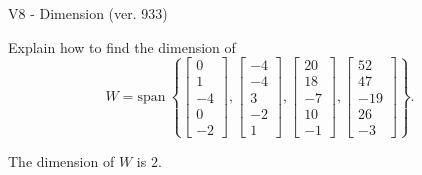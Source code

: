\begin{exercise}
  \begin{exerciseTitle}V8 - Dimension (ver. 933)\end{exerciseTitle}
  \begin{exerciseStatement}
    Explain how to find the dimension of 
\[W=\mathrm{span}\ \left\{\left[\begin{array}{r}
0 \\
1 \\
-4 \\
0 \\
-2
\end{array}\right] , \left[\begin{array}{r}
-4 \\
-4 \\
3 \\
-2 \\
1
\end{array}\right] , \left[\begin{array}{r}
20 \\
18 \\
-7 \\
10 \\
-1
\end{array}\right] , \left[\begin{array}{r}
52 \\
47 \\
-19 \\
26 \\
-3
\end{array}\right]\right\}.\]



  \end{exerciseStatement}
  \begin{exerciseAnswer}
   The dimension of \(W\) is  \(2\).
  


  \end{exerciseAnswer}
\end{exercise}